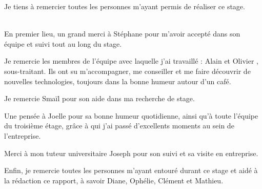 Je tiens à remercier toutes les personnes m'ayant permis de réaliser ce stage.\\~

En premier lieu, un grand merci à Stéphane  pour m'avoir accepté dans son équipe et suivi tout au long du stage.

Je remercie les membres de l'équipe avec laquelle j'ai travaillé : Alain  et Olivier , sous-traitant. Ils ont su m'accompagner, me conseiller et me faire découvrir de nouvelles technologies, toujours dans la bonne humeur autour d'un café.

Je remercie Smaïl  pour son aide dans ma recherche de stage. 

Une pensée à Joelle  pour sa bonne humeur quotidienne, ainsi qu'à toute l'équipe du troisième étage, grâce à qui j'ai passé d'excellents moments au sein de l'entreprise.

Merci à mon tuteur universitaire Joseph  pour son suivi et sa visite en entreprise.

Enfin, je remercie toutes les personnes m'ayant entouré durant ce stage et aidé à la rédaction ce rapport, à savoir Diane, Ophélie, Clément et Mathieu.

